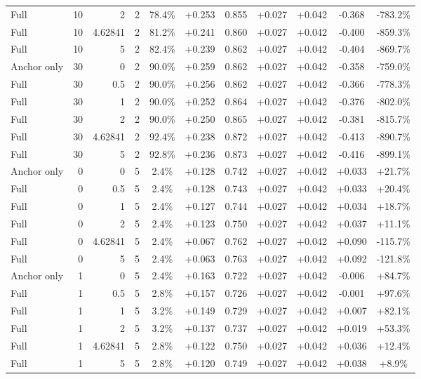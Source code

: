 \begin{table}[htbp]
\begin{tabular}{lrrrccccccc}
Full & 10 & 2 & 2 & 78.4\% & +0.253 & 0.855 & +0.027 & +0.042 & -0.368 & -783.2\% \\
Full & 10 & 4.62841 & 2 & 81.2\% & +0.241 & 0.860 & +0.027 & +0.042 & -0.400 & -859.3\% \\
Full & 10 & 5 & 2 & 82.4\% & +0.239 & 0.862 & +0.027 & +0.042 & -0.404 & -869.7\% \\
Anchor only & 30 & 0 & 2 & 90.0\% & +0.259 & 0.862 & +0.027 & +0.042 & -0.358 & -759.0\% \\
Full & 30 & 0.5 & 2 & 90.0\% & +0.256 & 0.862 & +0.027 & +0.042 & -0.366 & -778.3\% \\
Full & 30 & 1 & 2 & 90.0\% & +0.252 & 0.864 & +0.027 & +0.042 & -0.376 & -802.0\% \\
Full & 30 & 2 & 2 & 90.0\% & +0.250 & 0.865 & +0.027 & +0.042 & -0.381 & -815.7\% \\
Full & 30 & 4.62841 & 2 & 92.4\% & +0.238 & 0.872 & +0.027 & +0.042 & -0.413 & -890.7\% \\
Full & 30 & 5 & 2 & 92.8\% & +0.236 & 0.873 & +0.027 & +0.042 & -0.416 & -899.1\% \\
Anchor only & 0 & 0 & 5 & 2.4\% & +0.128 & 0.742 & +0.027 & +0.042 & +0.033 & +21.7\% \\
Full & 0 & 0.5 & 5 & 2.4\% & +0.128 & 0.743 & +0.027 & +0.042 & +0.033 & +20.4\% \\
Full & 0 & 1 & 5 & 2.4\% & +0.127 & 0.744 & +0.027 & +0.042 & +0.034 & +18.7\% \\
Full & 0 & 2 & 5 & 2.4\% & +0.123 & 0.750 & +0.027 & +0.042 & +0.037 & +11.1\% \\
Full & 0 & 4.62841 & 5 & 2.4\% & +0.067 & 0.762 & +0.027 & +0.042 & +0.090 & -115.7\% \\
Full & 0 & 5 & 5 & 2.4\% & +0.063 & 0.763 & +0.027 & +0.042 & +0.092 & -121.8\% \\
Anchor only & 1 & 0 & 5 & 2.4\% & +0.163 & 0.722 & +0.027 & +0.042 & -0.006 & +84.7\% \\
Full & 1 & 0.5 & 5 & 2.8\% & +0.157 & 0.726 & +0.027 & +0.042 & -0.001 & +97.6\% \\
Full & 1 & 1 & 5 & 3.2\% & +0.149 & 0.729 & +0.027 & +0.042 & +0.007 & +82.1\% \\
Full & 1 & 2 & 5 & 3.2\% & +0.137 & 0.737 & +0.027 & +0.042 & +0.019 & +53.3\% \\
Full & 1 & 4.62841 & 5 & 2.8\% & +0.122 & 0.750 & +0.027 & +0.042 & +0.036 & +12.4\% \\
Full & 1 & 5 & 5 & 2.8\% & +0.120 & 0.749 & +0.027 & +0.042 & +0.038 & +8.9\% \\

\end{tabular}
\end{table}
